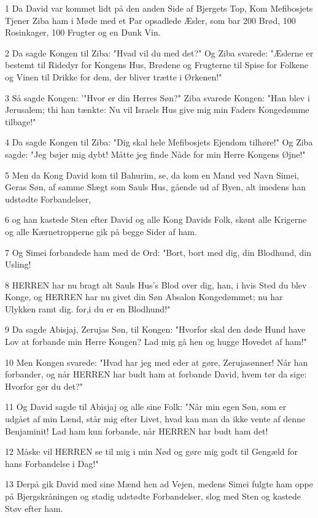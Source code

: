 \par 1 Da David var kommet lidt på den anden Side af Bjergets Top, Kom Mefibosjets Tjener Ziba ham i Møde med et Par opsadlede Æsler, som bar 200 Brød, 100 Rosinkager, 100 Frugter og en Dunk Vin.
\par 2 Da sagde Kongen til Ziba: "Hvad vil du med det?" Og Ziba svarede: "Æslerne er bestemt til Ridedyr for Kongens Hus, Brødene og Frugterne til Spise for Folkene og Vinen til Drikke for dem, der bliver trætte i Ørkenen!"
\par 3 Så sagde Kongen: '"Hvor er din Herres Søn?" Ziba svarede Kongen: "Han blev i Jerusalem; thi han tænkte: Nu vil Israels Hus give mig min Faders Kongedømme tilbage!"
\par 4 Da sagde Kongen til Ziba: "Dig skal hele Mefibosjets Ejendom tilhøre!" Og Ziba sagde: "Jeg bøjer mig dybt! Måtte jeg finde Nåde for min Herre Kongens Øjne!"
\par 5 Men da Kong David kom til Bahurim, se, da kom en Mand ved Navn Simei, Geras Søn, af samme Slægt som Sauls Hus, gående ud af Byen, alt imedens han udstødte Forbandelser,
\par 6 og han kastede Sten efter David og alle Kong Davids Folk, skønt alle Krigerne og alle Kærnetropperne gik på begge Sider af ham.
\par 7 Og Simei forbandede ham med de Ord: "Bort, bort med dig, din Blodhund, din Usling!
\par 8 HERREN har nu bragt alt Sauls Hus's Blod over dig, han, i hvis Sted du blev Konge, og HERREN har nu givet din Søn Absalon Kongedømmet; nu har Ulykken ramt dig. for,i du er en Blodhund!"
\par 9 Da sagde Abisjaj, Zerujas Søn, til Kongen: "Hvorfor skal den døde Hund have Lov at forbande min Herre Kongen? Lad mig gå hen og hugge Hovedet af ham!"
\par 10 Men Kongen svarede: "Hvad har jeg med eder at gøre, Zerujasønner! Når han forbander, og når HERREN har budt ham at forbande David, hvem tør da sige: Hvorfor gør du det?"
\par 11 Og David sagde til Abisjaj og alle sine Folk: "Når min egen Søn, som er udgået af min Lænd, står mig efter Livet, hvad kan man da ikke vente af denne Benjaminit! Lad ham kun forbande, når HERREN har budt ham det!
\par 12 Måske vil HERREN se til mig i min Nød og gøre mig godt til Gengæld for hans Forbandelse i Dag!"
\par 13 Derpå gik David med sine Mænd hen ad Vejen, medens Simei fulgte ham oppe på Bjergskråningen og stadig udstødte Forbandelser, slog med Sten og kastede Støv efter ham.
